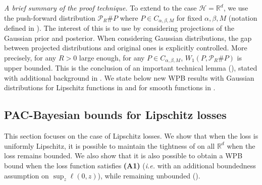 \textit{A brief summary of the proof technique.} To extend  to the case $\mathcal{H}=\mathbb{R}^d$, we use the push-forward distribution $\mathcal{P}_R \# P$ where $P\in C_{\alpha,\beta,M}$ for fixed $\alpha,\beta,M$ (notation defined in ).
The interest of this is to use  by considering projections of the Gaussian prior and posterior. When considering Gaussian distributions, the gap between projected distributions and original ones is explicitly controlled.
More precisely, for any $R>0$ large enough, for any $P\in C_{\alpha,\beta, M}$, $W_1(P, \mathcal{P}_R\# P)$ is upper bounded. This is the conclusion of an important technical lemma (), stated with additional background in .
We state below new WPB results with Gaussian distributions for Lipschitz functions in  and for smooth functions in .

\subsection{PAC-Bayesian bounds for Lipschitz losses}
\label{sec: main_sec_gaussian_lpz}

This section focuses on the case of Lipschitz losses. We show that when the loss is uniformly Lipschitz, it is possible to maintain the tightness of  on all $\mathbb{R}^d$ when the loss remains bounded. We also show that it is also possible to obtain a WPB bound when the loss function satisfies \textbf{(A1)} (\emph{i.e.} with an additional boundedness assumption on $\sup_{z} \ell(0,z)$), while remaining unbounded ().

